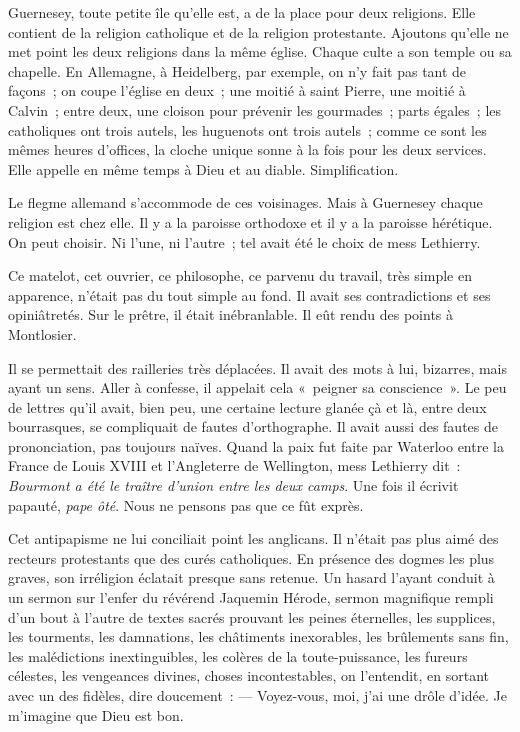 \documentclass[french,twoside]{book} %
\begin{document}
Guernesey, toute petite île qu’elle est, a de la place pour deux religions. Elle contient de la religion catholique et de la religion protestante. Ajoutons qu’elle ne met point les deux religions dans la même église. Chaque culte a son temple ou sa chapelle. En Allemagne, à Heidelberg, par exemple, on n’y fait pas tant  de façons ; on coupe l’église en deux ; une moitié à saint Pierre, une moitié à Calvin ; entre deux, une cloison pour prévenir les gourmades ; parts égales ; les catholiques ont trois autels, les huguenots ont trois autels ; comme ce sont les mêmes heures d’offices, la cloche unique sonne à la fois pour les deux services. Elle appelle en même temps à Dieu et au diable. Simplification.\par
Le flegme allemand s’accommode de ces voisinages. Mais à Guernesey chaque religion est chez elle. Il y a la paroisse orthodoxe et il y a la paroisse hérétique. On peut choisir. Ni l’une, ni l’autre ; tel avait été le choix de mess Lethierry.\par
Ce matelot, cet ouvrier, ce philosophe, ce parvenu du travail, très simple en apparence, n’était pas du tout simple au fond. Il avait ses contradictions et ses opiniâtretés. Sur le prêtre, il était inébranlable. Il eût rendu des points à Montlosier.\par
Il se permettait des railleries très déplacées. Il avait des mots à lui, bizarres, mais ayant un sens. Aller à confesse, il appelait cela « peigner sa conscience ». Le peu de lettres qu’il avait, bien peu, une certaine lecture glanée çà et là, entre deux bourrasques, se compliquait de fautes d’orthographe. Il avait aussi des fautes de prononciation, pas toujours naïves. Quand la paix fut faite par Waterloo entre la France de Louis XVIII et l’Angleterre de Wellington, mess Lethierry dit : \emph{Bourmont a été le traître d’union entre les deux camps}. Une fois il écrivit papauté, \emph{pape ôté}. Nous ne pensons pas que ce fût exprès.\par
 Cet antipapisme ne lui conciliait point les anglicans. Il n’était pas plus aimé des recteurs protestants que des curés catholiques. En présence des dogmes les plus graves, son irréligion éclatait presque sans retenue. Un hasard l’ayant conduit à un sermon sur l’enfer du révérend Jaquemin Hérode, sermon magnifique rempli d’un bout à l’autre de textes sacrés prouvant les peines éternelles, les supplices, les tourments, les damnations, les châtiments inexorables, les brûlements sans fin, les malédictions inextinguibles, les colères de la toute-puissance, les fureurs célestes, les vengeances divines, choses incontestables, on l’entendit, en sortant avec un des fidèles, dire doucement : — Voyez-vous, moi, j’ai une drôle d’idée. Je m’imagine que Dieu est bon.\par
\end{document}
